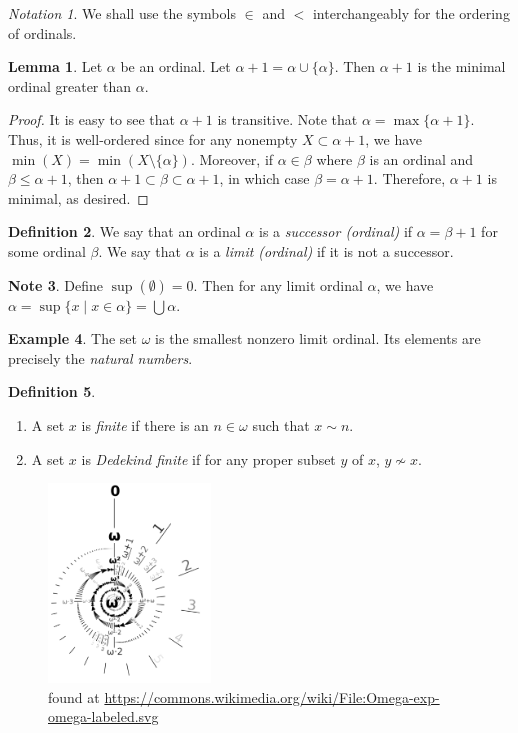 \documentclass[10pt,letterpaper,cm]{nupset}
\theoremstyle{definition}
\newtheorem{definition}{Definition}[subsection]
\newtheorem{exmp}[definition]{Example}
\newtheorem{note}[definition]{Note}
\theoremstyle{theorem}
\newtheorem{lemma}[definition]{Lemma}
\theoremstyle{remark}
\newtheorem*{notation}{Notation}
\newcommand{\1}{\mathbf{1}}
\newcommand{\0}{\vec 0}
\begin{document}
\begin{notation}
We shall use the symbols $\in$ and $<$ interchangeably for the ordering of ordinals. 
\end{notation}

\begin{lemma}
Let $\alpha$ be an ordinal. Let $\alpha +1 = \alpha \cup \{\alpha \}$. Then $\alpha +1$ is the minimal ordinal greater than $\alpha$. 
\end{lemma}
\begin{proof}
It is easy to see that $\alpha +1$ is transitive. Note that $\alpha  = \max\{\alpha +1\}$. Thus, it is well-ordered since for any nonempty $X \subset \alpha +1$, we have $\min(X) = \min(X \setminus \{\alpha \})$. Moreover, if $\alpha \in \beta$ where $\beta$ is an ordinal and $\beta \leq \alpha +1$, then $\alpha + 1 \subset \beta \subset \alpha +1$, in which case $\beta = \alpha +1$. Therefore, $\alpha +1$ is minimal, as desired. 
\end{proof}

\begin{definition}
We say that an ordinal $\alpha$ is a \textit{successor (ordinal)} if $\alpha = \beta +1$ for some ordinal $\beta$. We say that $\alpha$ is a \textit{limit (ordinal)} if it is not a successor.
\end{definition}

\begin{note}
Define $\sup(\emptyset) = 0$. Then for any limit ordinal $\alpha$, we have $\alpha = \sup\{x\mid x \in \alpha\} = \bigcup{\alpha}.$
\end{note}

\begin{exmp}
The set $\omega$ is  the smallest nonzero limit ordinal. Its elements are precisely the \textit{natural numbers}.
\end{exmp}

\begin{definition} $ $
\begin{enumerate}
\item A set $x$ is \textit{finite}  if there is an $n \in \omega$ such that $x \sim n$.
\item A set $x$ is \textit{Dedekind finite} if for any proper subset $y$ of $x$, $y \not \sim x$.
\end{enumerate}
\end{definition}

\begin{figure}[H]
\centering
\includegraphics[width=43mm]{ordinal-spiral.png}
\caption{found at \url{https://commons.wikimedia.org/wiki/File:Omega-exp-omega-labeled.svg}}
\end{figure}
\end{document}
